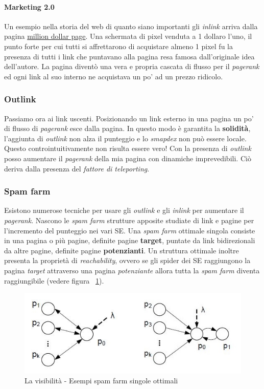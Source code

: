 				\paragraph{Marketing 2.0}
					Un esempio nella storia del web di quanto siano importanti gli \emph{inlink} arriva dalla pagina \href{http://www.milliondollarhomepage.com/}{million dollar page}. Una schermata di pixel venduta a 1 dollaro l'uno, il punto forte per cui tutti si affrettarono di acquistare almeno 1 pixel fu la presenza di tutti i link che puntavano alla pagina resa famosa dall'originale idea dell'autore. La pagina diventò una vera e propria cascata di flusso per il \emph{pagerank} ed ogni link al suo interno ne acquistava un po' ad un prezzo ridicolo.
			
			\subsubsection{Outlink}
				Passiamo ora ai link uscenti. Posizionando un link esterno in una pagina un po' di flusso di \emph{pagerank} esce dalla pagina. In questo modo è garantita la \textbf{solidità}, l'aggiunta di \emph{outlink} non alza il punteggio e lo \emph{smapdex} non può essere locale.
				Questo controintuitivamente non risulta essere vero! Con la presenza di \emph{outlink} posso aumentare il \emph{pagerank} della mia pagina con dinamiche imprevedibili. Ciò deriva dalla presenza del \emph{fattore di teleporting}.
			
			\subsubsection{Spam farm}
				Esistono numerose tecniche per usare gli \emph{outlink} e gli \emph{inlink} per aumentare il \emph{pagerank}. Nascono le \emph{spam farm} strutture apposite studiate di link e pagine per l'incremento del punteggio nei vari SE. 
				Una \emph{spam farm} ottimale singola consiste in una pagina o più pagine, definite pagine \textbf{target}, puntate da link bidirezionali da altre pagine, definite pagine \textbf{potenzianti}. Un struttura ottimale inoltre presenta la proprietà di \emph{reachability}, ovvero se gli spider dei SE raggiungono la pagina \emph{target} attraverso una pagina \emph{potenziante} allora tutta la \emph{spam farm} diventa raggiungibile (vedere figura ~\ref{fig:LaVisibilita-SpamFarm1}).
				
				\begin{figure} [h]
					\centering
					\includegraphics[scale=0.9]{images/LaVisibilita-SpamFarm1}
					\caption{La visibilità - Esempi spam farm singole ottimali}
					\label{fig:LaVisibilita-SpamFarm1}
				\end{figure}
				
